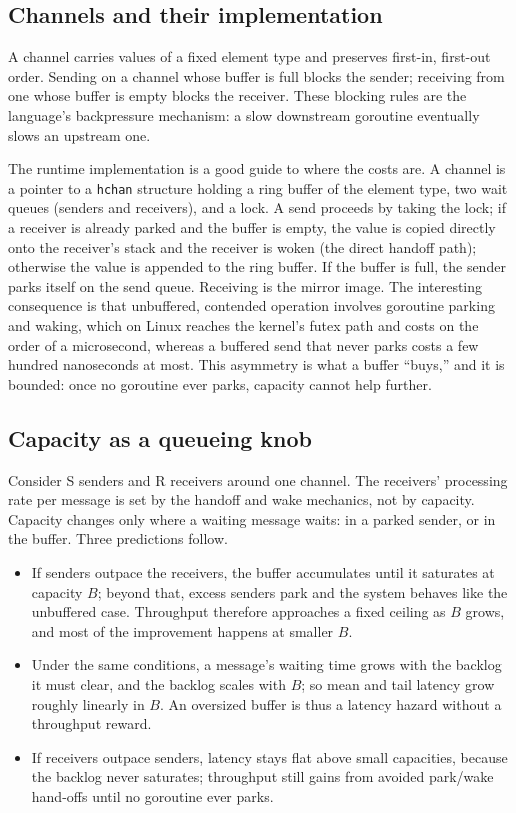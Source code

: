 \documentclass[10pt,a4paper]{article}
\begin{document}
\subsection{Channels and their implementation}
\label{sec:bg-channels}

A channel carries values of a fixed element type and preserves first-in,
first-out order. Sending on a channel whose buffer is full blocks the sender;
receiving from one whose buffer is empty blocks the receiver. These blocking
rules are the language's backpressure mechanism: a slow downstream goroutine
eventually slows an upstream one.

The runtime implementation is a good guide to where the costs are. A channel is
a pointer to a \texttt{hchan} structure holding a ring buffer of the element
type, two wait queues (senders and receivers), and a lock. A send proceeds by
taking the lock; if a receiver is already parked and the buffer is empty, the
value is copied directly onto the receiver's stack and the receiver is woken
(the direct handoff path); otherwise the value is appended to the ring buffer.
If the buffer is full, the sender parks itself on the send queue. Receiving is
the mirror image. The interesting consequence is that unbuffered, contended
operation involves goroutine parking and waking, which on Linux reaches the
kernel's futex path and costs on the order of a microsecond, whereas a buffered
send that never parks costs a few hundred nanoseconds at most. This asymmetry
is what a buffer ``buys,'' and it is bounded: once no goroutine ever parks,
capacity cannot help further.

\subsection{Capacity as a queueing knob}
\label{sec:bg-queueing}

Consider S senders and R receivers around one channel. The receivers' processing
rate per message is set by the handoff and wake mechanics, not by capacity.
Capacity changes only where a waiting message waits: in a parked sender, or in
the buffer. Three predictions follow.

\begin{itemize}
  \item[P1] If senders outpace the receivers, the buffer accumulates until it
        saturates at capacity $B$; beyond that, excess senders park and the
        system behaves like the unbuffered case. Throughput therefore approaches
        a fixed ceiling as $B$ grows, and most of the improvement happens at
        smaller $B$.
  \item[P2] Under the same conditions, a message's waiting time grows with the
        backlog it must clear, and the backlog scales with $B$; so mean and
        tail latency grow roughly linearly in $B$. An oversized buffer is thus
        a latency hazard without a throughput reward.
  \item[P3] If receivers outpace senders, latency stays flat above small
        capacities, because the backlog never saturates; throughput still gains
        from avoided park/wake hand-offs until no goroutine ever parks.
\end{itemize}
\end{document}
